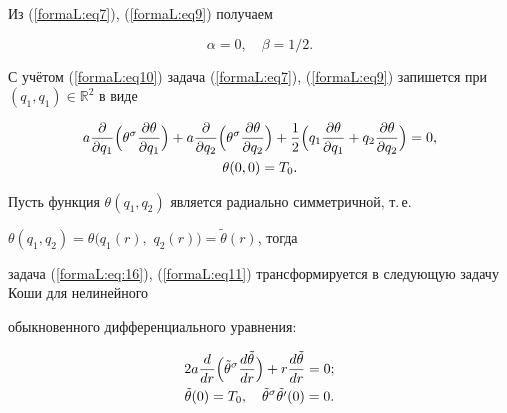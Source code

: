Из (\ref{formaL:eq7}), (\ref{formaL:eq9}) получаем

\begin{equation}

\label{formaL:eq10}

\alpha =0,

\quad

\beta =1/2.

\end{equation}

С учётом (\ref{formaL:eq10}) задача (\ref{formaL:eq7}), (\ref{formaL:eq9}) запишется при $(q_1, q_1)\in \mathbb R^2$ в виде

\begin{gather}

a\frac{\partial }{\partial q_1 }\Bigl(\theta ^\sigma \frac{\partial \theta }{\partial q_1 }\Bigr)+

a\frac{\partial }{\partial q_2 }\Bigl(\theta ^\sigma \frac{\partial \theta }{\partial q_2 }\Bigr)+

\frac{1}{2}\Bigl(q_1 \frac{\partial \theta }{\partial q_1 }+q_2 \frac{\partial \theta }{\partial q_2 }\Bigr)=0,

\label{formaL:eq:16}

\\

\label{formaL:eq11}

\theta (0, 0)=T_0 .

\end{gather}



Пусть функция $\theta (q_1 ,q_2 )$ является радиально симметричной, т.\,е. 

$\theta (q_1, q_2 ){=}\theta \bigl(q_1 (r),$ $ q_2 (r)\bigr)=\tilde {\theta }(r)$, тогда 

задача (\ref{formaL:eq:16}), (\ref{formaL:eq11}) трансформируется в следующую задачу Коши для нелинейного 

обыкновенного дифференциального уравнения:

\begin{gather}

\label{formaL:eq12}

2a\frac{d}{dr}\Bigl(\tilde {\theta }^\sigma \frac{d\tilde {\theta }}{dr}

\Bigr)+

r\frac{d\tilde {\theta }}{dr}=0;

\\

\notag

\tilde {\theta }(0)=T_0 ,

\quad

\tilde {\theta }^\sigma \tilde {{\theta }'}(0)=0.

\end{gather}

